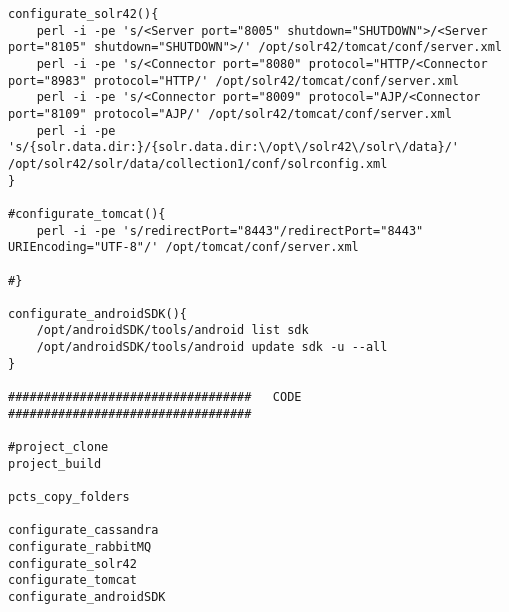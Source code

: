 \begin{lstlisting}[style=Bash]
configurate_solr42(){
	perl -i -pe 's/<Server port="8005" shutdown="SHUTDOWN">/<Server port="8105" shutdown="SHUTDOWN">/' /opt/solr42/tomcat/conf/server.xml 
	perl -i -pe 's/<Connector port="8080" protocol="HTTP/<Connector port="8983" protocol="HTTP/' /opt/solr42/tomcat/conf/server.xml 
	perl -i -pe 's/<Connector port="8009" protocol="AJP/<Connector port="8109" protocol="AJP/' /opt/solr42/tomcat/conf/server.xml 
	perl -i -pe 's/{solr.data.dir:}/{solr.data.dir:\/opt\/solr42\/solr\/data}/' /opt/solr42/solr/data/collection1/conf/solrconfig.xml 
}

#configurate_tomcat(){
	perl -i -pe 's/redirectPort="8443"/redirectPort="8443" URIEncoding="UTF-8"/' /opt/tomcat/conf/server.xml

#}

configurate_androidSDK(){
	/opt/androidSDK/tools/android list sdk 
	/opt/androidSDK/tools/android update sdk -u --all
}

##################################   CODE    ################################## 

#project_clone
project_build

pcts_copy_folders

configurate_cassandra
configurate_rabbitMQ
configurate_solr42
configurate_tomcat
configurate_androidSDK
\end{lstlisting}